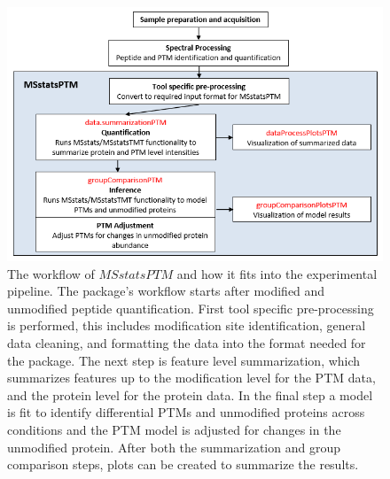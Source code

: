 \documentclass[mcp]{article}
\numberwithin{table}{section}
\begin{document}

\begin{figure}[ht]
\centering
\includegraphics[scale=.8]{images/MSstatsPTM_design.png}
\caption{The workflow of $MSstatsPTM$ and how it fits into the experimental pipeline. The package's workflow starts after modified and unmodified peptide quantification. First tool specific pre-processing is performed, this includes modification site identification, general data cleaning, and formatting the data into the format needed for the package. The next step is feature level summarization, which summarizes features up to the modification level for the PTM data, and the protein level for the protein data. In the final step a model is fit to identify differential PTMs and unmodified proteins across conditions and the PTM model is adjusted for changes in the unmodified protein. After both the summarization and group comparison steps, plots can be created to summarize the results.}
\label{fig:msstatsptm_design}
\end{figure}
\end{document}
